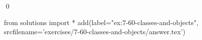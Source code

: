 
\begin{ex}
  \label{ex:7-60-classes-and-objects}
  
  \qed
\end{ex}
\begin{python0}
from solutions import *
add(label="ex:7-60-classes-and-objects",
    srcfilename='exercises/7-60-classes-and-objects/answer.tex')
\end{python0}
